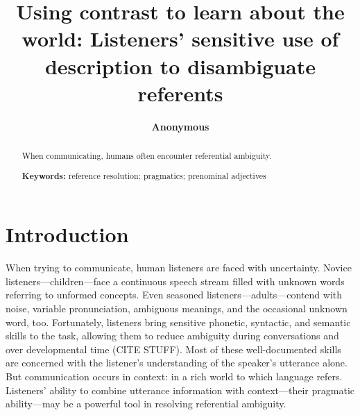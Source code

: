 \documentclass[10pt, letterpaper]{article}
\title{Using contrast to learn about the world: Listeners' sensitive use of
description to disambiguate referents}
\author{{\large \bf Anonymous}}
\begin{document}
\maketitle

\begin{abstract}
When communicating, humans often encounter referential ambiguity.

\textbf{Keywords:}
reference resolution; pragmatics; prenominal adjectives
\end{abstract}

\hypertarget{introduction}{%
\section{Introduction}\label{introduction}}

When trying to communicate, human listeners are faced with uncertainty.
Novice listeners---children---face a continuous speech stream filled
with unknown words referring to unformed concepts. Even seasoned
listeners---adults---contend with noise, variable pronunciation,
ambiguous meanings, and the occasional unknown word, too. Fortunately,
listeners bring sensitive phonetic, syntactic, and semantic skills to
the task, allowing them to reduce ambiguity during conversations and
over developmental time (CITE STUFF). Most of these well-documented
skills are concerned with the listener's understanding of the speaker's
utterance alone. But communication occurs in context: in a rich world to
which language refers. Listeners' ability to combine utterance
information with context---their pragmatic ability---may be a powerful
tool in resolving referential ambiguity.
\end{document}

